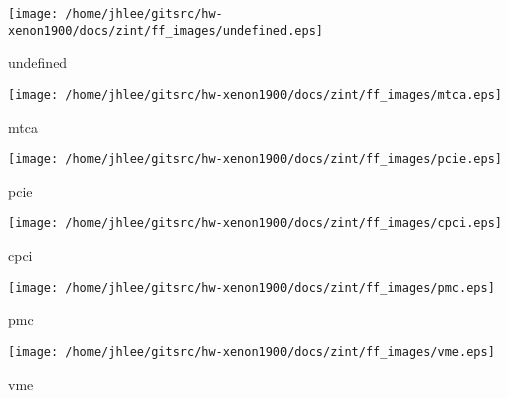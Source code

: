 \noindent
\vspace{1.4cm}
\begin{minipage}{.2\textwidth}
\begin{center}
\texttt{[image: /home/jhlee/gitsrc/hw-xenon1900/docs/zint/ff\_images/undefined.eps]}
\end{center}
\end{minipage}
\begin{minipage}{.7\textwidth}
undefined
\end{minipage}


\noindent
\vspace{1.4cm}
\begin{minipage}{.2\textwidth}
\begin{center}
\texttt{[image: /home/jhlee/gitsrc/hw-xenon1900/docs/zint/ff\_images/mtca.eps]}
\end{center}
\end{minipage}
\begin{minipage}{.7\textwidth}
mtca
\end{minipage}


\noindent
\vspace{1.4cm}
\begin{minipage}{.2\textwidth}
\begin{center}
\texttt{[image: /home/jhlee/gitsrc/hw-xenon1900/docs/zint/ff\_images/pcie.eps]}
\end{center}
\end{minipage}
\begin{minipage}{.7\textwidth}
pcie
\end{minipage}


\noindent
\vspace{1.4cm}
\begin{minipage}{.2\textwidth}
\begin{center}
\texttt{[image: /home/jhlee/gitsrc/hw-xenon1900/docs/zint/ff\_images/cpci.eps]}
\end{center}
\end{minipage}
\begin{minipage}{.7\textwidth}
cpci
\end{minipage}


\noindent
\vspace{1.4cm}
\begin{minipage}{.2\textwidth}
\begin{center}
\texttt{[image: /home/jhlee/gitsrc/hw-xenon1900/docs/zint/ff\_images/pmc.eps]}
\end{center}
\end{minipage}
\begin{minipage}{.7\textwidth}
pmc
\end{minipage}


\noindent
\vspace{1.4cm}
\begin{minipage}{.2\textwidth}
\begin{center}
\texttt{[image: /home/jhlee/gitsrc/hw-xenon1900/docs/zint/ff\_images/vme.eps]}
\end{center}
\end{minipage}
\begin{minipage}{.7\textwidth}
vme
\end{minipage}


